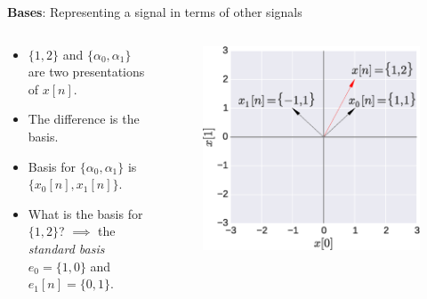 \documentclass{beamer}
\begin{document}
\begin{frame}{\textbf{Bases}: Representing a signal in terms of other signals}\

\begin{columns}
	\begin{column}{.6\linewidth}
		\begin{itemize}
		\item $\{1,2\}$ and $\{\alpha_0, \alpha_1\}$ are two presentations of $x[n]$.
		\item The difference is the basis.
		\item Basis for $\{\alpha_0, \alpha_1\}$ is $\{x_0[n], x_1[n]\}$.
		\item What is the basis for $\{1, 2\}$? $\implies$ the \textit{standard basis} $e_0 = \{1, 0\}$ and $e_1[n]=\{0,1\}$.
		\end{itemize}
	\end{column}
	
	\begin{column}{.4\linewidth}
	\begin{figure}
	\includegraphics[width=\textwidth]{img/bases.eps}
	\end{figure}
	\end{column}
\end{columns}
\end{frame}
\end{document}

